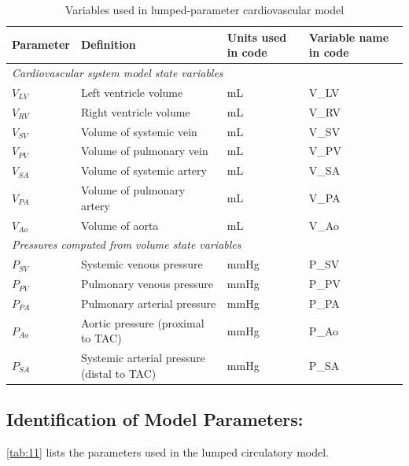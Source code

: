\documentclass[fleqn,10pt]{physiome}
\begin{document}
\begin{table}[ht]\centering
\small
\caption{Variables used in lumped-parameter cardiovascular model}\label{tab:10}
\begin{tabular}{l l l l}
\toprule
Parameter & Definition & Units used in code & Variable name in code \\
\midrule
\multicolumn{4}{l}{\em Cardiovascular system model state variables} \\
$V_{LV}$ & Left ventricle volume & mL & V\_LV \\
$V_{RV}$ & Right ventricle volume & mL & V\_RV \\
$V_{SV}$ & Volume of systemic vein & mL & V\_SV \\
$V_{PV}$ & Volume of pulmonary vein & mL & V\_PV \\
$V_{SA}$ & Volume of systemic artery & mL & V\_SA \\
$V_{PA}$ & Volume of pulmonary artery & mL & V\_PA \\
$V_{Ao}$ & Volume of aorta & mL & V\_Ao \\

\multicolumn{4}{l}{\em Pressures computed from volume state variables} \\
$P_{SV}$ & Systemic venous pressure & mmHg & P\_SV \\
$P_{PV}$ & Pulmonary venous pressure & mmHg & P\_PV \\
$P_{PA}$ & Pulmonary arterial pressure & mmHg & P\_PA \\
$P_{Ao}$ & Aortic pressure (proximal to TAC) & mmHg & P\_Ao \\
$P_{SA}$ & Systemic arterial pressure (distal to TAC) & mmHg & P\_SA \\

\bottomrule
\end{tabular}
\end{table}

\subsection{Identification of Model Parameters:}

\autoref{tab:11} lists the parameters used in the lumped circulatory model.
\end{document}
